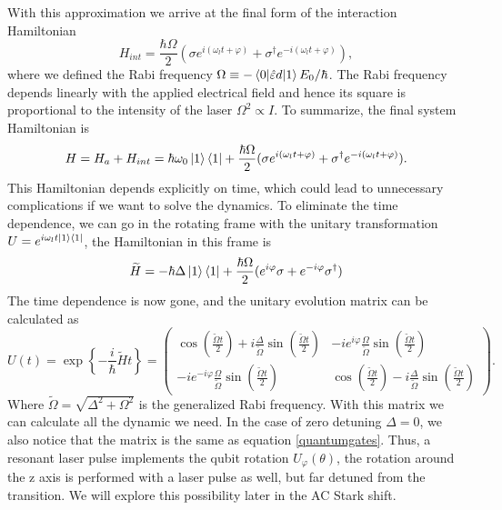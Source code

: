 With this approximation we arrive at the final form of the interaction Hamiltonian
\begin{equation}
H_{int} = \frac{\hbar \Omega}{2}(\sigma e^{i(\omega_l t+\varphi)} + \sigma^\dagger e^{-i(\omega_l t+\varphi)}),
\end{equation}
 where we defined the Rabi frequency $\Omega \equiv - \braket{0|\hat{\varepsilon} d|1}E_0/\hbar$. The Rabi frequency depends linearly with the applied electrical field and hence its square is proportional to the intensity of the laser $\Omega ^2 \propto I$. To summarize, the final system Hamiltonian is
 \begin{equation}
 \label{2levelatomhamiltonian}
H = H_a + H_{int} = \hbar\omega_0 \ket{1}\bra{1} + \frac{\hbar \Omega}{2}(\sigma e^{i(\omega_l t+\varphi)} + \sigma^\dagger e^{-i(\omega_l t+\varphi)}).
 \end{equation}
This Hamiltonian depends explicitly on time, which could lead to unnecessary complications if we want to solve the dynamics. To eliminate the time dependence, we can go in the rotating frame with the unitary transformation $U = e^{i\omega_l t \ket{1}\bra{1}}$, the Hamiltonian in this frame is
\begin{equation}
\label{Hamiltonianrotatingframe}
\widetilde{H} = -\hbar \Delta \ket{1}\bra{1} + \frac{\hbar \Omega}{2}(e^{i\varphi}\sigma + e^{-i\varphi}\sigma^\dagger)
\end{equation}
The time dependence is now gone, and the unitary evolution matrix can be calculated as
\begin{equation}
\label{laserpulse}
U(t) = \exp\left\{-\frac{i}{\hbar} \widetilde{H} t \right\} =
 \begin{pmatrix}
  \cos\left(\frac{\widetilde{\Omega} t}{2}\right) + i \frac{\Delta}{\widetilde{\Omega}} \sin\left(\frac{\widetilde{\Omega} t}{2}\right) & -ie^{i\varphi}\frac{\Omega}{\widetilde{\Omega}}  \sin\left(\frac{\widetilde{\Omega} t}{2}\right) \\
  -ie^{-i\varphi}\frac{\Omega}{\widetilde{\Omega}}  \sin\left(\frac{\widetilde{\Omega} t}{2}\right)  & \cos\left(\frac{\widetilde{\Omega} t}{2}\right) - i \frac{\Delta}{\widetilde{\Omega}} \sin\left(\frac{\widetilde{\Omega} t}{2}\right)
\end{pmatrix}.
\end{equation}
Where $\widetilde{\Omega} = \sqrt{\Delta^2 + \Omega^2}$ is the generalized Rabi frequency. With this matrix we can calculate all the dynamic we need. In the case of zero detuning $\Delta = 0$, we also notice that the matrix is the same as equation \eqref{quantumgates}. Thus, a resonant laser pulse implements the qubit rotation $U_{\varphi}(\theta)$, the rotation around the z axis is performed with a laser pulse as well, but far detuned from the transition. We will explore this possibility later in the AC Stark shift.\\
